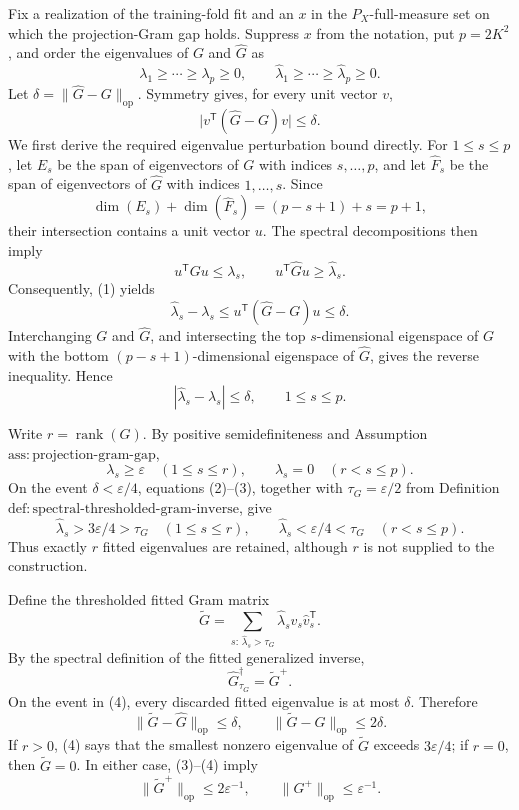 Fix a realization of the training-fold fit and an \(x\) in the \(P_X\)-full-measure set on which the projection-Gram gap holds.  Suppress \(x\) from the notation, put \(p=2K^2\), and order the eigenvalues of \(G\) and \(\widehat G\) as
\[
 \lambda_1\geq\cdots\geq\lambda_p\geq0,
 \qquad
 \widehat\lambda_1\geq\cdots\geq\widehat\lambda_p\geq0.
\]
Let \(\delta=\|\widehat G-G\|_{\mathrm{op}}\).  Symmetry gives, for every unit vector \(v\),
\[
 \bigl|v^{\mathsf T}(\widehat G-G)v\bigr|\leq\delta. \tag{1}
\]
We first derive the required eigenvalue perturbation bound directly.  For \(1\leq s\leq p\), let \(E_s\) be the span of eigenvectors of \(G\) with indices \(s,\ldots,p\), and let \(\widehat F_s\) be the span of eigenvectors of \(\widehat G\) with indices \(1,\ldots,s\).  Since
\[
 \dim(E_s)+\dim(\widehat F_s)=(p-s+1)+s=p+1,
\]
their intersection contains a unit vector \(u\).  The spectral decompositions then imply
\[
 u^{\mathsf T}Gu\leq\lambda_s,
 \qquad
 u^{\mathsf T}\widehat Gu\geq\widehat\lambda_s.
\]
Consequently, (1) yields
\[
 \widehat\lambda_s-\lambda_s
 \leq u^{\mathsf T}(\widehat G-G)u
 \leq\delta.
\]
Interchanging \(G\) and \(\widehat G\), and intersecting the top \(s\)-dimensional eigenspace of \(G\) with the bottom \((p-s+1)\)-dimensional eigenspace of \(\widehat G\), gives the reverse inequality.  Hence
\[
 |\widehat\lambda_s-\lambda_s|\leq\delta,
 \qquad 1\leq s\leq p. \tag{2}
\]

Write \(r=\operatorname{rank}(G)\).  By positive semidefiniteness and Assumption~\(\mathrm{ass{:}projection\mbox{-}gram\mbox{-}gap}\),
\[
 \lambda_s\geq\varepsilon\quad(1\leq s\leq r),
 \qquad
 \lambda_s=0\quad(r<s\leq p). \tag{3}
\]
On the event \(\delta<\varepsilon/4\), equations (2)--(3), together with \(\tau_G=\varepsilon/2\) from Definition~\(\mathrm{def{:}spectral\mbox{-}thresholded\mbox{-}gram\mbox{-}inverse}\), give
\[
 \widehat\lambda_s>3\varepsilon/4>\tau_G
 \quad(1\leq s\leq r),
 \qquad
 \widehat\lambda_s<\varepsilon/4<\tau_G
 \quad(r<s\leq p). \tag{4}
\]
Thus exactly \(r\) fitted eigenvalues are retained, although \(r\) is not supplied to the construction.

Define the thresholded fitted Gram matrix
\[
 \widetilde G
 =\sum_{s:\,\widehat\lambda_s>\tau_G}
   \widehat\lambda_s\widehat v_s\widehat v_s^{\mathsf T}.
\]
By the spectral definition of the fitted generalized inverse,
\[
 \widehat G_{\tau_G}^{\dagger}=\widetilde G^+ . \tag{5}
\]
On the event in (4), every discarded fitted eigenvalue is at most \(\delta\).  Therefore
\[
 \|\widetilde G-\widehat G\|_{\mathrm{op}}\leq\delta,
 \qquad
 \|\widetilde G-G\|_{\mathrm{op}}\leq2\delta. \tag{6}
\]
If \(r>0\), (4) says that the smallest nonzero eigenvalue of \(\widetilde G\) exceeds \(3\varepsilon/4\); if \(r=0\), then \(\widetilde G=0\).  In either case, (3)--(4) imply
\[
 \|\widetilde G^+\|_{\mathrm{op}}\leq2\varepsilon^{-1},
 \qquad
 \|G^+\|_{\mathrm{op}}\leq\varepsilon^{-1}. \tag{7}
\]

